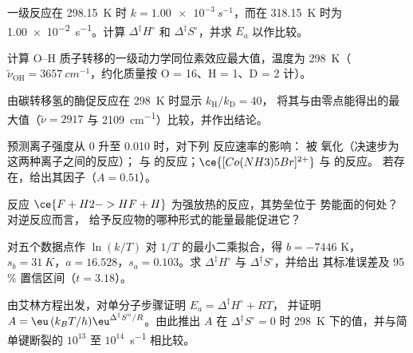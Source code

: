 \begin{exercise}[$\star\star$]\label{exo:b3:rate-theories:5}
一级反应在 \qty{298.15}{K} 时 $k = \qty{1.00e-3}{s^{-1}}$，而在
\qty{318.15}{K} 时为 \qty{1.00e-2}{s^{-1}}。计算 $\Delta^{\ddagger}H^\circ$ 和 $\Delta^{\ddagger}S^\circ$，并求 $E_a$ 以作比较。
\end{exercise}

\begin{exercise}[$\star\star$]\label{exo:b3:rate-theories:6}
计算 O--H 质子转移的一级动力学同位素效应最大值，温度为
\qty{298}{K}（$\tilde\nu_{\mathrm{OH}} = \qty{3657}{cm^{-1}}$，约化质量按 O = 16、H = 1、D = 2 计）。
\end{exercise}

\begin{exercise}[$\star\star$]\label{exo:b3:rate-theories:7}
由碳转移氢的酶促反应在 \qty{298}{K} 时显示 $k_{\mathrm H}/k_{\mathrm D} = 40$，
将其与由零点能得出的最大值（$\tilde\nu = 2917$ 与 \qty{2109}{cm^{-1}}）比较，并作出结论。
\end{exercise}

\begin{exercise}[$\star\star$]\label{exo:b3:rate-theories:8}
预测离子强度从 0 升至 0.010 时，对下列
反应速率的影响： 被  氧化（决速步为这两种离子之间的反应）；
 与  的反应；$\ce{[Co(NH3)5Br]^{2+}}$ 与  的反应。
若存在，给出其因子（$A = 0.51$）。
\end{exercise}

\begin{exercise}[$\star\star$]\label{exo:b3:rate-theories:9}
反应 $\ce{F + H2 -> HF + H}$ 为强放热的反应，其势垒位于
势能面的何处？对逆反应而言，
给予反应物的哪种形式的能量最能促进它？
\end{exercise}

\begin{exercise}[$\star\star\star$]\label{exo:b3:rate-theories:10}
对五个数据点作 $\ln(k/T)$ 对 $1/T$ 的最小二乘拟合，得 $b = -7446$ K，
$s_b = \qty{31}{K}$，$a = 16.528$，$s_a = 0.103$。求 $\Delta^{\ddagger}H^\circ$ 与 $\Delta^{\ddagger}S^\circ$，并给出
其标准误差及 95\,\% 置信区间（$t = 3.18$）。
\end{exercise}

\begin{exercise}[$\star\star\star$]\label{exo:b3:rate-theories:11}
由艾林方程出发，对单分子步骤证明 $E_a = \Delta^{\ddagger}H^\circ + RT$，
并证明 $A = \eu\,(k_BT/h)\eu^{\Delta^{\ddagger}S^\circ/R}$。由此推出 $A$ 在 $\Delta^{\ddagger}S^\circ = 0$ 时
\qty{298}{K} 下的值，并与简单键断裂的 $10^{13}$ 至 $10^{14}$~\unit{s^{-1}} 相比较。
\end{exercise}

